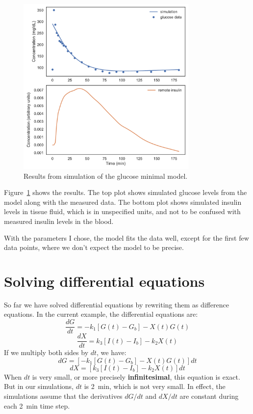 \documentclass[12pt]{book}
\theoremstyle{exercise}
\begin{document}
\begin{figure}
\centerline{\includegraphics[width=3.5in]{figs/chap18-fig01.pdf}}
\caption{Results from simulation of the glucose minimal model.}
\label{chap18-fig01}
\end{figure}

Figure~\ref{chap18-fig01} shows the results.  The top plot shows simulated glucose levels from the model along with the measured data.  The bottom plot shows simulated insulin levels in tissue fluid, which is in unspecified units, and not to be confused with measured insulin levels in the blood.

With the parameters I chose, the model fits the data well, except for the first few data points, where we don't expect the model to be precise.


\section{Solving differential equations}
\label{slopefunc}

So far we have solved differential equations by rewriting them as difference equations.  In the current example, the differential equations are:
%
\[ \frac{dG}{dt} = -k_1 \left[ G(t) - G_b \right] - X(t) G(t)  \]
%
\[ \frac{dX}{dt} = k_3 \left[I(t) - I_b \right] - k_2 X(t) \]
%
If we multiply both sides by $dt$, we have:
%
\[ dG = \left[ -k_1 \left[ G(t) - G_b \right] - X(t) G(t) \right] dt  \]
%
\[ dX = \left[ k_3 \left[I(t) - I_b \right] - k_2 X(t) \right] dt \]
%
When $dt$ is very small, or more precisely {\bf infinitesimal}, this equation is exact.  But in our simulations, $dt$ is \SI{2}{\minute}, which is not very small.  In effect, the simulations assume that the derivatives $dG/dt$ and $dX/dt$ are constant during each \SI{2}{\minute} time step.
\end{document}
